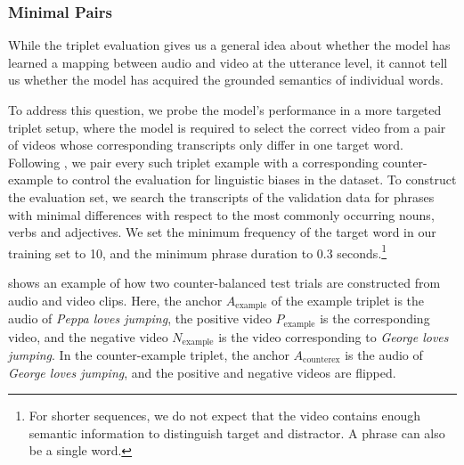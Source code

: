 \subsubsection{Minimal Pairs}
\label{sec:targeted}
While the triplet evaluation gives us a general idea about whether the model 
has learned a mapping between audio and video at the utterance level, it 
cannot tell us whether the model has acquired the grounded semantics 
of individual words.

To address this question, we probe the model's performance in a more targeted 
triplet setup, where the model is required to select the correct video from a 
pair of videos whose corresponding transcripts only differ in one target word.
Following \citet{nikolaus-fourtassi-2021-evaluating},
we pair every such triplet example with a corresponding counter-example to 
control the evaluation for linguistic biases in the dataset.
%
To construct the evaluation set, we search the transcripts of the validation 
data for phrases with minimal differences with respect to the most commonly 
occurring nouns, verbs and adjectives. We set the minimum frequency of the 
target word in our training set to 10, and the minimum phrase duration to 0.3 
seconds.\footnote{For shorter sequences, we do not 
expect that the video contains enough semantic information to 
distinguish target and distractor. A phrase can also be a single word.}

 shows an example of how two counter-balanced test
trials are constructed from audio and video clips. 
Here, the anchor $A_{\text{example}}$ of the example
triplet is the audio of \textit{Peppa loves jumping}, the positive video 
$P_{\text{example}}$ is the corresponding video, and the negative video 
$N_{\text{example}}$ is the video corresponding to \textit{George loves 
jumping}. In the counter-example triplet, the anchor $A_{\text{counterex}}$ is 
the audio of \textit{George loves jumping}, and the positive and negative videos 
are flipped. %

